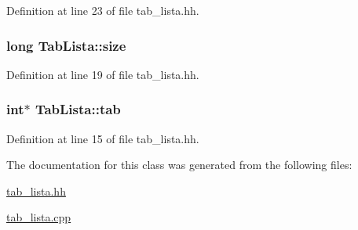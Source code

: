 Definition at line 23 of file tab\-\_\-lista.\-hh.

\hypertarget{class_tab_lista_aa3c6d623be318ec8410fa447281380da}{
\subsubsection[{size}]{\setlength{\rightskip}{0pt plus 5cm}long Tab\-Lista\-::size\hspace{0.3cm}{\ttfamily [private]}}}\label{class_tab_lista_aa3c6d623be318ec8410fa447281380da}


Definition at line 19 of file tab\-\_\-lista.\-hh.

\hypertarget{class_tab_lista_a06f658ed62f3db852813e90dcc5876a5}{
\subsubsection[{tab}]{\setlength{\rightskip}{0pt plus 5cm}int$\ast$ Tab\-Lista\-::tab\hspace{0.3cm}{\ttfamily [private]}}}\label{class_tab_lista_a06f658ed62f3db852813e90dcc5876a5}


Definition at line 15 of file tab\-\_\-lista.\-hh.



The documentation for this class was generated from the following files\-:\begin{DoxyCompactItemize}
\item 
\hyperlink{tab__lista_8hh}{tab\-\_\-lista.\-hh}\item 
\hyperlink{tab__lista_8cpp}{tab\-\_\-lista.\-cpp}\end{DoxyCompactItemize}
